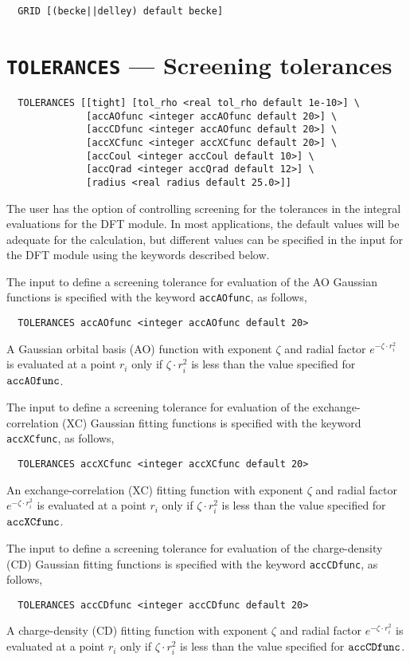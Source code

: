 \begin{verbatim}
  GRID [(becke||delley) default becke]
\end{verbatim}

\section{{\tt TOLERANCES} --- Screening tolerances}

\begin{verbatim}
  TOLERANCES [[tight] [tol_rho <real tol_rho default 1e-10>] \
              [accAOfunc <integer accAOfunc default 20>] \
              [accCDfunc <integer accAOfunc default 20>] \
              [accXCfunc <integer accXCfunc default 20>] \
              [accCoul <integer accCoul default 10>] \
              [accQrad <integer accQrad default 12>] \
              [radius <real radius default 25.0>]]
\end{verbatim}
%
%
The user has the option of controlling screening for the tolerances in
the integral evaluations for the DFT module.  In most applications,
the default values will be adequate for the calculation, but different
values can be specified in the input for the DFT module using the
keywords described below.

The input to define a screening tolerance for evaluation of the AO 
Gaussian functions is specified with the keyword \verb+accAOfunc+, as
follows,
\begin{verbatim}
  TOLERANCES accAOfunc <integer accAOfunc default 20>
\end{verbatim}
A Gaussian orbital basis (AO) function with exponent $\zeta$
and radial factor $e^{-\zeta\cdot r_i^2}$ is 
evaluated  at a point $r_i$ only if 
$\zeta\cdot r_i^2$ is less than the value specified for ${\tt accAOfunc}$.

The input to define a screening tolerance for evaluation of the exchange-
correlation (XC) Gaussian fitting functions is specified with the
keyword \verb+accXCfunc+, as follows,
\begin{verbatim}
  TOLERANCES accXCfunc <integer accXCfunc default 20>
\end{verbatim}
An exchange-correlation (XC) fitting function with exponent $\zeta$
and radial factor $e^{-\zeta\cdot r_i^2}$ is 
evaluated  at a point $r_i$ only if 
$\zeta\cdot r_i^2$ is less than the value specified for ${\tt accXCfunc}$.

The input to define a screening tolerance for evaluation of the
charge-density (CD) Gaussian fitting functions is specified with the
keyword \verb+accCDfunc+, as follows,
\begin{verbatim}
  TOLERANCES accCDfunc <integer accCDfunc default 20>
\end{verbatim}
A  charge-density (CD) fitting function with exponent $\zeta$
and radial factor $e^{-\zeta\cdot r_i^2}$ is evaluated  at a 
point $r_i$ only if $\zeta\cdot r_i^2$ is less than the value 
specified for ${\tt accCDfunc}$.


